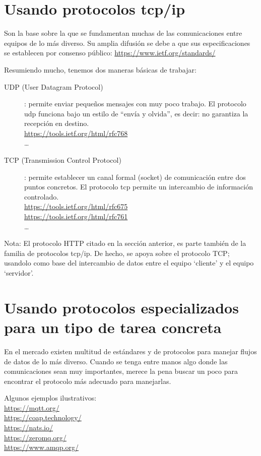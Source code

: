 \documentclass[spanish,12pt,a4paper,final,oneside]{book}
\begin{document}
\section{Usando protocolos tcp/ip}
Son la base sobre la que se fundamentan muchas de las comunicaciones entre equipos de lo más diverso. Su amplia difusión se debe a que sus especificaciones se establecen por consenso público: \url{https://www.ietf.org/standards/} 

Resumiendo mucho, tenemos dos maneras básicas de trabajar:
\begin{description}
\item[UDP (User Datagram Protocol)]: permite enviar pequeños mensajes con muy poco trabajo. El protocolo udp funciona bajo un estilo de “envía y olvida”, es decir: no garantiza la recepción en destino.
\\ \url{https://tools.ietf.org/html/rfc768}
\\ \ldots
\item[TCP (Transmission Control Protocol)]: permite establecer un canal formal (socket) de comunicación entre dos puntos concretos. El protocolo tcp permite un intercambio de información controlado.
\\ \url{https://tools.ietf.org/html/rfc675}
\\ \url{https://tools.ietf.org/html/rfc761}
\\ \ldots
\end{description}

Nota: El protocolo HTTP citado en la sección anterior, es parte también de la familia de protocolos tcp/ip. De hecho, se apoya sobre el protocolo TCP; usandolo como base del intercambio de datos entre el equipo ‘cliente’ y el equipo ‘servidor’.

\section{Usando protocolos especializados para un tipo de tarea concreta}
En el mercado existen multitud de estándares y de protocolos para manejar flujos de datos de lo más diverso. Cuando se tenga entre manos algo donde las comunicaciones sean muy importantes, merece la pena buscar un poco para encontrar el protocolo más adecuado para manejarlas.

Algunos ejemplos ilustrativos:
\\ \url{https://mqtt.org/}
\\ \url{https://coap.technology/}
\\ \url{https://nats.io/}
\\ \url{https://zeromq.org/}
\\ \url{https://www.amqp.org/}
\end{document}
